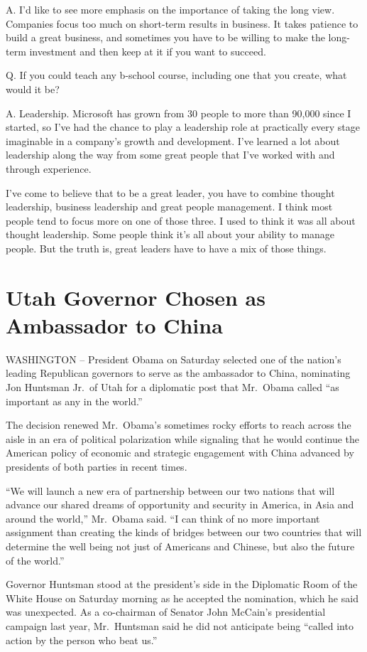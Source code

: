 \documentclass[12pt,a4paper,onecolumn]{article}
\begin{document}
A. I'd like to see more emphasis on the importance of taking the long view. Companies focus too much
on short-term results in business. It takes patience to build a great business, and sometimes you
have to be willing to make the long-term investment and then keep at it if you want to succeed.

\textsf{Q. If you could teach any b-school course, including one that you create, what would it be?}

A. Leadership. Microsoft has grown from 30 people to more than 90,000 since I started, so I've had
the chance to play a leadership role at practically every stage imaginable in a company's growth and
development. I've learned a lot about leadership along the way from some great people that I've
worked with and through experience.

I've come to believe that to be a great leader, you have to combine thought leadership, business
leadership and great people management. I think most people tend to focus more on one of those
three. I used to think it was all about thought leadership. Some people think it's all about your
ability to manage people. But the truth is, great leaders have to have a mix of those things.

\section{Utah Governor Chosen as Ambassador to China}

WASHINGTON -- President Obama on Saturday selected one of the nation's leading Republican governors
to serve as the ambassador to China, nominating Jon Huntsman Jr.~of Utah for a diplomatic post that
Mr.~Obama called ``as important as any in the world.''

The decision renewed Mr.~Obama's sometimes rocky efforts to reach across the aisle in an era of
political polarization while signaling that he would continue the American policy of economic and
strategic engagement with China advanced by presidents of both parties in recent times.

``We will launch a new era of partnership between our two nations that will advance our shared
dreams of opportunity and security in America, in Asia and around the world,'' Mr.~Obama said. ``I
can think of no more important assignment than creating the kinds of bridges between our two
countries that will determine the well being not just of Americans and Chinese, but also the future
of the world.''

Governor Huntsman stood at the president's side in the Diplomatic Room of the White House on
Saturday morning as he accepted the nomination, which he said was unexpected. As a co-chairman of
Senator John McCain's presidential campaign last year, Mr.~Huntsman said he did not anticipate being
``called into action by the person who beat us.''
\end{document}
